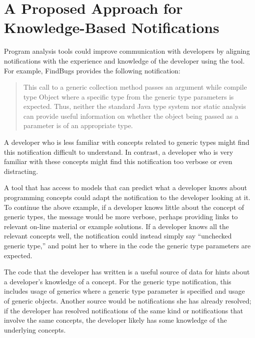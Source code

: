 \documentclass{llncs}
\begin{document}
\section{A Proposed Approach for Knowledge-Based Notifications}
Program analysis tools could improve communication with developers by aligning notifications with the experience and knowledge of the developer using the tool.
For example, FindBugs provides the following notification:

\vspace*{-1ex}
\begin{quotation}
	\noindent \small{
		This call to a generic collection method passes an argument while compile type Object where a specific type from the generic type parameters is expected. Thus, neither the standard Java type system nor static analysis can provide useful information on whether the object being passed as a parameter is of an appropriate type.}
\end{quotation}
\vspace*{-1ex}

\noindent
A developer who is less familiar with concepts related to generic types might find this notification difficult to understand. 
In contrast, a developer who is very familiar with these concepts might find this notification too verbose or even distracting.

A tool that has access to models that can predict what a developer knows about programming concepts could adapt the notification to the developer looking at it.
To continue the above example, if a developer knows little about the concept of generic types, the message would be more verbose, perhaps providing links to relevant on-line material or example solutions.
If a developer knows all the relevant concepts well, the notification could instead simply say ``unchecked generic type,'' and point her to where in the code the generic type parameters are expected.

The code that the developer has written is a useful source of data for hints about a developer's knowledge of a concept.
For the generic type notification, this includes usage of generics where a generic type parameter is specified and usage of generic objects.
Another source would be notifications she has already resolved; if the developer has resolved notifications of the same kind or notifications that involve the same concepts, the developer likely has some knowledge of the underlying concepts.
\end{document}

